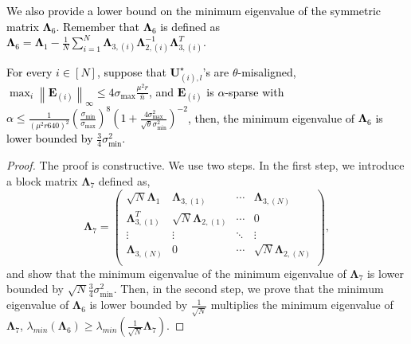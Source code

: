 \documentclass[twoside,11pt]{article}
\newcommand{\revise}[1]{\textcolor{black}{ #1}}
\newcommand{\norm}[1]{\left\lVert#1\right\rVert}
\newcommand{\matE}{\mathbf{E}}
\newcommand{\matLambda}{\mathbf{\Lambda}}
\newcommand{\matU}{\mathbf{U}}
\newcommand{\gop}{\sigma_{\max}}
\newcommand{\bn}{{\overline{n}}}
\newcommand{\sm}{\sigma_{\min}}
\newcommand{\sms}{\sigma_{\min}^2}
\begin{document}
\revise{We also provide a lower bound on the minimum eigenvalue of the symmetric matrix $\matLambda_6$. Remember that $\matLambda_6$ is defined as $\matLambda_6 = \matLambda_1 - \frac{1}{N}\sum_{i=1}^N\matLambda_{3,(i)}\matLambda_{2,(i)}^{-1}\matLambda_{3,(i)}^T$.
\begin{lemma}
\label{lm:l6eigenvaluelowerbound}
For every $i\in [N]$, suppose that $\matU^\star_{(i),l}$'s are $\theta$-misaligned, $\max_i\norm{\matE_{(i)}}_{\infty}\le 4\gop\frac{\mu^2 r}{\bn}$, and $\matE_{(i)}$ is $\alpha$-sparse with $
\alpha \le \frac{1}{\left(\mu^2r640\right)^2}\left(\frac{\sm}{\gop}\right)^8\left(1+\frac{4\gop^2}{\sqrt{\theta}\sms}\right)^{-2}$, then, the minimum eigenvalue of $\matLambda_{6}$ is lower bounded by $\frac{3}{4}\sms$. 
\end{lemma}}
\begin{proof}
The proof is constructive. We use two steps. In the first step, we introduce a block matrix $\matLambda_{7}$ defined as,
\begin{equation}
   \matLambda_7 = \begin{pmatrix}
    \sqrt{N}\matLambda_1 & \matLambda_{3,(1)}&\cdots&\matLambda_{3,(N)}\\
    \matLambda_{3,(1)}^T&\sqrt{N}\matLambda_{2,(1)}&\cdots&0\\
    \vdots&\vdots&\ddots&\vdots\\
    \matLambda_{3,(N)}&0&\cdots&\sqrt{N}\matLambda_{2,(N)}\\
   \end{pmatrix},
\end{equation}
 and show that the minimum eigenvalue of the minimum eigenvalue of $\matLambda_7$ is lower bounded by $\sqrt{N}\frac{3}{4}\sms$. Then, in the second step, we prove that the minimum eigenvalue of $\matLambda_{6}$ is lower bounded by $\frac{1}{\sqrt{N}}$ multiplies the minimum eigenvalue of $\matLambda_{7}$, $\lambda_{min}(\matLambda_6)\ge \lambda_{min}(\frac{1}{\sqrt{N}}\matLambda_7)$.


\end{proof}
\end{document}
